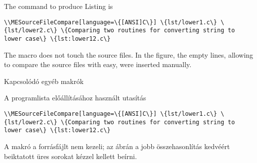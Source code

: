 {
\par\noindent The command to produce Listing \ao{\ref{lst:lower12.c}} is
\par\noindent\lstinline|\\MESourceFileCompare[language=\{[ANSI]C\}] \{lst/lower1.c\} \{lst/lower2.c\} \{Comparing two routines for converting string to lower case\} \{lst:lower12.c\}|


The macro does not touch the source files. In the figure, the empty lines,
allowing to compare the source files with easy, were inserted manually.
}
{Kapcsolódó egyéb makrók}
{
\par\noindent A \ao{\ref{lst:lower12.c}} programlista előállításához használt
utasítás
\par\noindent\lstinline|\\MESourceFileCompare[language=\{[ANSI]C\}] \{lst/lower1.c\} \{lst/lower2.c\} \{Comparing two routines for converting string to lower case\} \{lst:lower12.c\}|


A makró a forrásfájlt nem kezeli; az ábrán a jobb összehasonlítás kedvéért
beiktatott üres sorokat kézzel kellett beírni.
}



